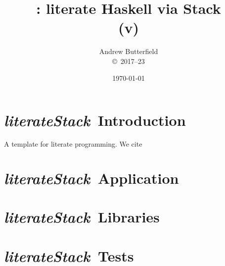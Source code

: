 \documentclass[fleqn,10pt]{report}
\author{
Andrew Butterfield
\\
{\small \copyright\ 2017--23}
}
\title{
  \literateStack: literate Haskell via Stack
  \\(v\litStackVersion)
}
\date{
\today
}
\def\literateStack{\textit{\textsf{literateStack}}}
\begin{document}
\maketitle
\tableofcontents

\chapter{\literateStack\ Introduction}

A template for literate programming.
We cite \cite{MathHbk:05,conf/utp/Butterfield10,conf/utp/Butterfield12}

\chapter{\literateStack\ Application}



\chapter{\literateStack\ Libraries}



\chapter{\literateStack\ Tests}

% 



\end{document}
